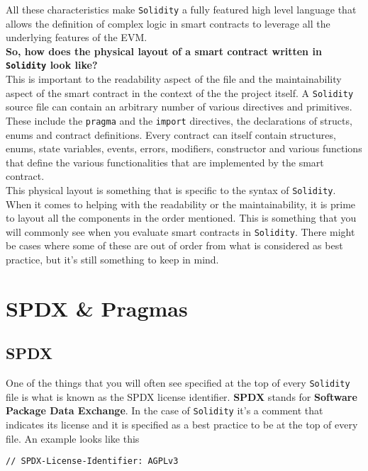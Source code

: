 All these characteristics make \texttt{Solidity} a fully featured high level language that allows the definition of complex logic in smart contracts to leverage all the underlying features of the EVM.\\

\textbf{So, how does the physical layout of a smart contract written in \texttt{Solidity} look like?}\\

This is important to the readability aspect of the file and the maintainability aspect of the smart contract in the context of the the project itself.
A \texttt{Solidity} source file can contain an arbitrary number of various directives and primitives.
These include the \texttt{pragma} and the \texttt{import} directives, the declarations of structs, enums and contract definitions.
Every contract can itself contain structures, enums, state variables, events, errors, modifiers, constructor and various functions that define the various functionalities that are implemented by the smart contract.\\

This physical layout is something that is specific to the syntax of \texttt{Solidity}.
When it comes to helping with the readability or the maintainability, it is prime to layout all the components in the order mentioned.
This is something that you will commonly see when you evaluate smart contracts in \texttt{Solidity}.
There might be cases where some of these are out of order from what is considered as best practice, but it's still something to keep in mind.

\section{SPDX \& Pragmas}

\subsection*{SPDX}

One of the things that you will often see specified at the top of every \texttt{Solidity} file is what is known as the SPDX license identifier.
\textbf{SPDX} stands for \textbf{Software Package Data Exchange}.
In the case of \texttt{Solidity} it's a comment that indicates its license and it is specified as a best practice to be at the top of every file.
An example looks like this

\begin{lstlisting}[language=Solidity, style=solStyle, caption={Example of SPDX comment.}]
// SPDX-License-Identifier: AGPLv3
\end{lstlisting}

